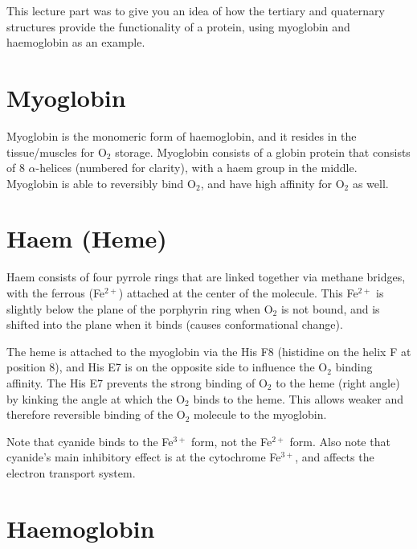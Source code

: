 This lecture part was to give you an idea of how the tertiary and quaternary structures provide the functionality of  a protein, using myoglobin and haemoglobin as an example.

\section{Myoglobin}

Myoglobin is the monomeric form of haemoglobin, and it resides in the tissue/muscles for O$_2$ storage.
Myoglobin consists of a globin protein that consists of 8 $\alpha$-helices (numbered for clarity), with a haem group in the middle.
Myoglobin is able to reversibly bind O$_2$, and have high affinity for O$_2$ as well.

\begin{center}
\end{center}

\section{Haem (Heme)}

Haem consists of four pyrrole rings that are linked together via methane bridges, with the ferrous (Fe$^{2+}$) attached at the center of the molecule.
This Fe$^{2+}$ is slightly below the plane of the porphyrin ring when O$_2$ is not bound, and is shifted into the plane when it binds (causes conformational change).

The heme is attached to the myoglobin via the His F8 (histidine on the helix F at position 8), and His E7 is on the opposite side to influence the O$_2$ binding affinity.
The His E7 prevents the strong binding of O$_2$ to the heme (right angle) by kinking the angle at which the O$_2$ binds to the heme.
This allows weaker and therefore reversible binding of the O$_2$ molecule to the myoglobin.

Note that cyanide binds to the Fe$^{3+}$ form, not the Fe$^{2+}$ form.
Also note that cyanide's main inhibitory effect is at the cytochrome Fe$^{3+}$, and affects the electron transport system.

\begin{center}
\end{center}

\section{Haemoglobin}

